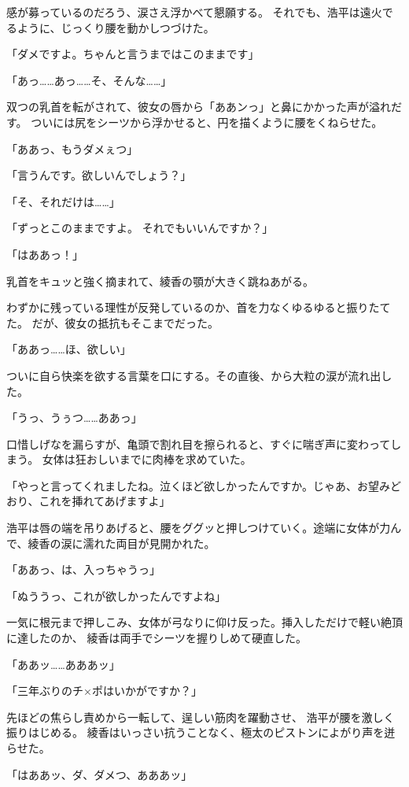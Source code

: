 ﻿\documentclass[
    book,tate,
    line_length=30zw,
    jafontsize=12pt,
    paper=b5j,
    landscape,
    ]{jlreq}
\begin{document}
感が募っているのだろう、涙さえ浮かべて懇願する。
それでも、浩平は遠火でるように、じっくり腰を動かしつづけた。

「ダメですよ。ちゃんと言うまではこのままです」

「あっ……あっ……そ、そんな……」

双つの乳首を転がされて、彼女の唇から「ああンっ」と鼻にかかった声が溢れだす。
ついには尻をシーツから浮かせると、円を描くように腰をくねらせた。

「ああっ、もうダメぇつ」

「言うんです。欲しいんでしょう？」

「そ、それだけは……」

「ずっとこのままですよ。 それでもいいんですか？」

「はああっ！」

乳首をキュッと強く摘まれて、綾香の顎が大きく跳ねあがる。

わずかに残っている理性が反発しているのか、首を力なくゆるゆると振りたてた。
だが、彼女の抵抗もそこまでだった。

「ああっ……ほ、欲しい」

ついに自ら快楽を欲する言葉を口にする。その直後、から大粒の涙が流れ出した。

「うっ、うぅつ……ああっ」

口惜しげなを漏らすが、亀頭で割れ目を擦られると、すぐに喘ぎ声に変わってしまう。
女体は狂おしいまでに肉棒を求めていた。

「やっと言ってくれましたね。泣くほど欲しかったんですか。じゃあ、お望みどおり、これを挿れてあげますよ」

浩平は唇の端を吊りあげると、腰をググッと押しつけていく。途端に女体が力んで、綾香の涙に濡れた両目が見開かれた。

「ああっ、は、入っちゃうっ」

「ぬううっ、これが欲しかったんですよね」

一気に根元まで押しこみ、女体が弓なりに仰け反った。挿入しただけで軽い絶頂に達したのか、
綾香は両手でシーツを握りしめて硬直した。

「ああッ……あああッ」

「三年ぶりのチ×ポはいかがですか？」

先ほどの焦らし責めから一転して、逞しい筋肉を躍動させ、 浩平が腰を激しく振りはじめる。
綾香はいっさい抗うことなく、極太のピストンによがり声を迸らせた。

「はああッ、ダ、ダメつ、あああッ」
\end{document}
